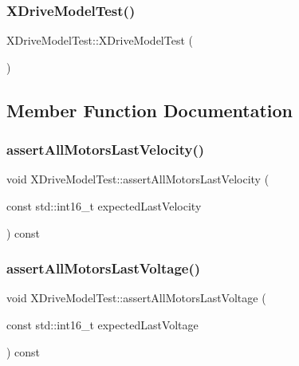 \subsubsection{\texorpdfstring{XDriveModelTest()}{XDriveModelTest()}}
{\footnotesize\ttfamily X\+Drive\+Model\+Test\+::\+X\+Drive\+Model\+Test (\begin{DoxyParamCaption}{ }\end{DoxyParamCaption})\hspace{0.3cm}{\ttfamily [inline]}}



\subsection{Member Function Documentation}
\mbox{\label{classXDriveModelTest_a7b9d3f3d5b3ca0d4ad3041b3e8920b6a}} 
\subsubsection{\texorpdfstring{assertAllMotorsLastVelocity()}{assertAllMotorsLastVelocity()}}
{\footnotesize\ttfamily void X\+Drive\+Model\+Test\+::assert\+All\+Motors\+Last\+Velocity (\begin{DoxyParamCaption}\item[{const std\+::int16\+\_\+t}]{expected\+Last\+Velocity }\end{DoxyParamCaption}) const\hspace{0.3cm}{\ttfamily [inline]}}

\mbox{\label{classXDriveModelTest_a0e380979e1134286d9e6130281d6c71c}} 
\subsubsection{\texorpdfstring{assertAllMotorsLastVoltage()}{assertAllMotorsLastVoltage()}}
{\footnotesize\ttfamily void X\+Drive\+Model\+Test\+::assert\+All\+Motors\+Last\+Voltage (\begin{DoxyParamCaption}\item[{const std\+::int16\+\_\+t}]{expected\+Last\+Voltage }\end{DoxyParamCaption}) const\hspace{0.3cm}{\ttfamily [inline]}}

